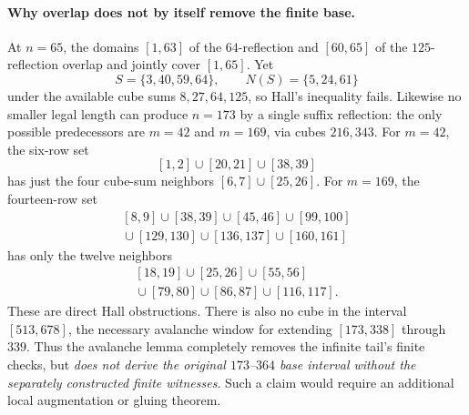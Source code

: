 \documentclass[10pt]{article}
\begin{document}
\paragraph{Why overlap does not by itself remove the finite base.}
At $n=65$, the domains $[1,63]$ of the
$64$-reflection and $[60,65]$ of the
$125$-reflection overlap and jointly cover
$[1,65]$. Yet
\[
S=\{3,40,59,64\},\qquad
N(S)=\{5,24,61\}
\]
under the available cube sums $8,27,64,125$,
so Hall's inequality fails.
Likewise no smaller legal length can produce
$n=173$ by a single suffix reflection:
the only possible predecessors are
$m=42$ and $m=169$, via cubes $216,343$.
For $m=42$, the six-row set
\[
[1,2]\cup[20,21]\cup[38,39]
\]
has just the four cube-sum neighbors
$[6,7]\cup[25,26]$.
For $m=169$, the fourteen-row set
\[
\begin{gathered}
[8,9]\cup[38,39]\cup[45,46]\cup[99,100]\\
{}\cup[129,130]\cup[136,137]\cup[160,161]
\end{gathered}
\]
has only the twelve neighbors
\[
\begin{gathered}
[18,19]\cup[25,26]\cup[55,56]\\
{}\cup[79,80]\cup[86,87]\cup[116,117].
\end{gathered}
\]
These are direct Hall obstructions.
There is also no cube in the interval
$[513,678]$, the necessary avalanche
window for extending $[173,338]$ through
$339$. Thus the avalanche lemma completely
removes the infinite tail's finite checks,
but \emph{does not derive the original
$173$--$364$ base interval without the
separately constructed finite witnesses}.
Such a claim would require an additional
local augmentation or gluing theorem.
\end{document}
